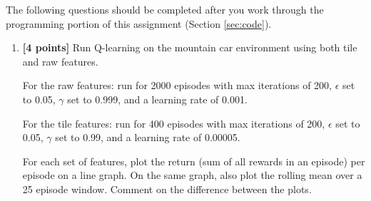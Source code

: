 \documentclass[11pt]{article}
\numberwithin{equation}{section} %
\numberwithin{figure}{section} %
\numberwithin{table}{section} %
\begin{document}
The following questions should be completed after you work through the programming portion of this assignment (Section \ref{sec:code}). 

\begin{enumerate}
\item \textbf{[4 points]} Run Q-learning on the mountain car environment using both tile and raw features. 

For the raw features: run for 2000 episodes with max iterations of 200, $\epsilon$ set to 0.05, $\gamma$ set to 0.999, and a learning rate of 0.001. 

For the tile features: run for 400 episodes with max iterations of 200, $\epsilon$ set to 0.05, $\gamma$ set to 0.99, and a learning rate of 0.00005.

For each set of features, plot the return (sum of all rewards in an episode) per episode on a line graph. On the same graph, also plot the rolling mean over a 25 episode window. Comment on the difference between the plots.

\begin{tcolorbox}[fit,height=12cm, width=\linewidth, blank, borderline={1pt}{-2pt},nobeforeafter]
\end{tcolorbox}

\end{enumerate}
\end{document}
